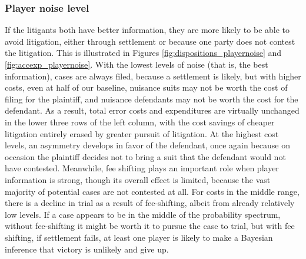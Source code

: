 \documentclass{article}
\begin{document}
\subsubsection{Player noise level}

If the litigants both have better information, they are more likely to be able to avoid litigation, either through settlement or because one party does not contest the litigation. This is illustrated in Figures \ref{fig:dispositions_playernoise} and \ref{fig:accexp_playernoise}. With the lowest levels of noise (that is, the best information), cases are always filed, because a settlement is likely, but with higher costs, even at half of our baseline, nuisance suits may not be worth the cost of filing for the plaintiff, and nuisance defendants may not be worth the cost for the defendant. As a result, total error costs and expenditures are virtually unchanged in the lower three rows of the left column, with the cost savings of cheaper litigation entirely erased by greater pursuit of litigation. At the highest cost levels, an asymmetry develops in favor of the defendant, once again because on occasion the plaintiff decides not to bring a suit that the defendant would not have contested. Meanwhile, fee shifting plays an important role when player information is strong, though its overall effect is limited, because the vast majority of potential cases are not contested at all. For costs in the middle range, there is a decline in trial as a result of fee-shifting, albeit from already relatively low levels. If a case appears to be in the middle of the probability spectrum, without fee-shifting it might be worth it to pursue the case to trial, but with fee shifting, if settlement fails, at least one player is likely to make a Bayesian inference that victory is unlikely and give up. 
\end{document}
